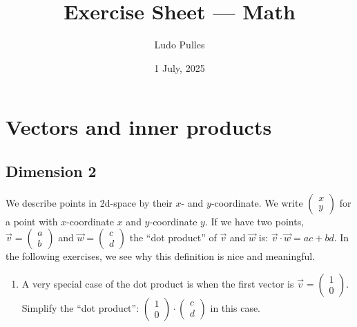 \documentclass[12pt,a4paper]{article}
\author{Ludo Pulles}
\date{1 July, 2025}
\title{Exercise Sheet --- Math}
\newcommand{\twovec}[2]{\ensuremath{\begin{pmatrix}{#1}\\{#2}\end{pmatrix}}}
\begin{document}
\maketitle
\onehalfspacing%

\section{Vectors and inner products}

\subsection{Dimension 2}
We describe points in 2d-space by their \(x\)- and \(y\)-coordinate.
We write \(\displaystyle\twovec{x}{y}\) for a point with \(x\)-coordinate \(x\) and \(y\)-coordinate \(y\).
If we have two points, \(\displaystyle\vec{v} = \twovec{a}{b}\) and \(\displaystyle\vec{w} = \twovec{c}{d}\) the ``dot product'' of \(\vec{v}\) and \(\vec{w}\) is: \(\vec{v} \cdot \vec{w} = ac + bd\).
In the following exercises, we see why this definition is nice and meaningful.

\begin{enumerate}[label=(i)]
\item A very special case of the dot product is when the first vector is \(\displaystyle \vec{v} = \twovec{1}{0}\).
	Simplify the ``dot product'': \(\twovec{1}{0} \cdot \twovec{c}{d}\) in this case.
\end{enumerate}
\end{document}
